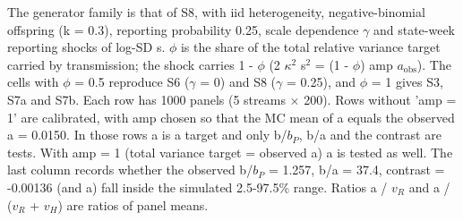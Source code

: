 \noindent\begin{minipage}{\linewidth}\footnotesize\raggedright
The generator family is that of S8, with iid heterogeneity, negative-binomial offspring (k = 0.3), reporting probability 0.25, scale dependence $\gamma$ and state-week reporting shocks of log-SD s. $\phi$ is the share of the total relative variance target carried by transmission; the shock carries 1 - $\phi$ (2 $\kappa^2$ s$^2$ = (1 - $\phi$) amp $a_{\mathrm{obs}}$). The cells with $\phi$ = 0.5 reproduce S6 ($\gamma$ = 0) and S8 ($\gamma$ = 0.25), and $\phi$ = 1 gives S3, S7a and S7b. Each row has 1000 panels (5 streams $\times$ 200). Rows without 'amp = 1' are calibrated, with amp chosen so that the MC mean of a equals the observed a = 0.0150. In those rows a is a target and only b/$b_P$, b/a and the contrast are tests. With amp = 1 (total variance target = observed a) a is tested as well. The last column records whether the observed b/$b_P$ = 1.257, b/a = 37.4, contrast = -0.00136 (and a) fall inside the simulated 2.5-97.5\% range. Ratios a / $v_R$ and a / ($v_R$ + $v_H$) are ratios of panel means.
\end{minipage}\par
\endgroup

